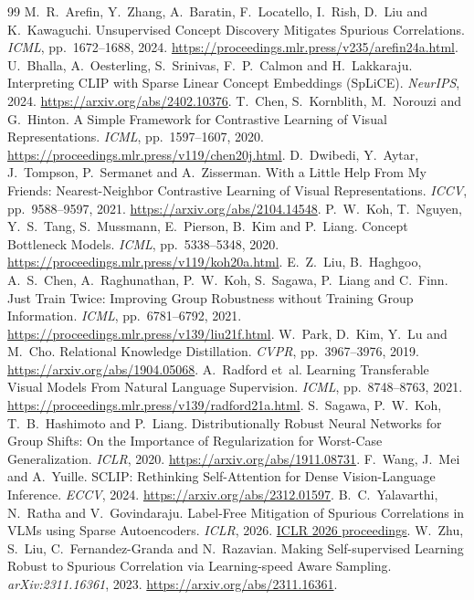 \documentclass{article}
\begin{document}
\begingroup
\footnotesize
\setlength{\bibsep}{4pt plus 1pt}
\begin{thebibliography}{99}
M.~R.~Arefin, Y.~Zhang, A.~Baratin, F.~Locatello, I.~Rish, D.~Liu and K.~Kawaguchi.
Unsupervised Concept Discovery Mitigates Spurious Correlations.
\emph{ICML}, pp.~1672--1688, 2024.
\url{https://proceedings.mlr.press/v235/arefin24a.html}.
U.~Bhalla, A.~Oesterling, S.~Srinivas, F.~P.~Calmon and H.~Lakkaraju.
Interpreting CLIP with Sparse Linear Concept Embeddings (SpLiCE).
\emph{NeurIPS}, 2024. \url{https://arxiv.org/abs/2402.10376}.
T.~Chen, S.~Kornblith, M.~Norouzi and G.~Hinton.
A Simple Framework for Contrastive Learning of Visual Representations.
\emph{ICML}, pp.~1597--1607, 2020.
\url{https://proceedings.mlr.press/v119/chen20j.html}.
D.~Dwibedi, Y.~Aytar, J.~Tompson, P.~Sermanet and A.~Zisserman.
With a Little Help From My Friends: Nearest-Neighbor Contrastive Learning
of Visual Representations. \emph{ICCV}, pp.~9588--9597, 2021.
\url{https://arxiv.org/abs/2104.14548}.
P.~W.~Koh, T.~Nguyen, Y.~S.~Tang, S.~Mussmann, E.~Pierson, B.~Kim and P.~Liang.
Concept Bottleneck Models. \emph{ICML}, pp.~5338--5348, 2020.
\url{https://proceedings.mlr.press/v119/koh20a.html}.
E.~Z.~Liu, B.~Haghgoo, A.~S.~Chen, A.~Raghunathan, P.~W.~Koh,
S.~Sagawa, P.~Liang and C.~Finn.
Just Train Twice: Improving Group Robustness without Training Group Information.
\emph{ICML}, pp.~6781--6792, 2021.
\url{https://proceedings.mlr.press/v139/liu21f.html}.
W.~Park, D.~Kim, Y.~Lu and M.~Cho.
Relational Knowledge Distillation. \emph{CVPR}, pp.~3967--3976, 2019.
\url{https://arxiv.org/abs/1904.05068}.
A.~Radford et~al.
Learning Transferable Visual Models From Natural Language Supervision.
\emph{ICML}, pp.~8748--8763, 2021.
\url{https://proceedings.mlr.press/v139/radford21a.html}.
S.~Sagawa, P.~W.~Koh, T.~B.~Hashimoto and P.~Liang.
Distributionally Robust Neural Networks for Group Shifts: On the Importance
of Regularization for Worst-Case Generalization.
\emph{ICLR}, 2020. \url{https://arxiv.org/abs/1911.08731}.
F.~Wang, J.~Mei and A.~Yuille.
SCLIP: Rethinking Self-Attention for Dense Vision-Language Inference.
\emph{ECCV}, 2024. \url{https://arxiv.org/abs/2312.01597}.
B.~C.~Yalavarthi, N.~Ratha and V.~Govindaraju.
Label-Free Mitigation of Spurious Correlations in VLMs using Sparse Autoencoders.
\emph{ICLR}, 2026.
\href{https://proceedings.iclr.cc/paper_files/paper/2026/hash/359242d225d2fba218a85e147803f8b7-Abstract-Conference.html}{ICLR 2026 proceedings}.
W.~Zhu, S.~Liu, C.~Fernandez-Granda and N.~Razavian.
Making Self-supervised Learning Robust to Spurious Correlation via
Learning-speed Aware Sampling. \emph{arXiv:2311.16361}, 2023.
\url{https://arxiv.org/abs/2311.16361}.
\end{thebibliography}
\endgroup
\end{document}
